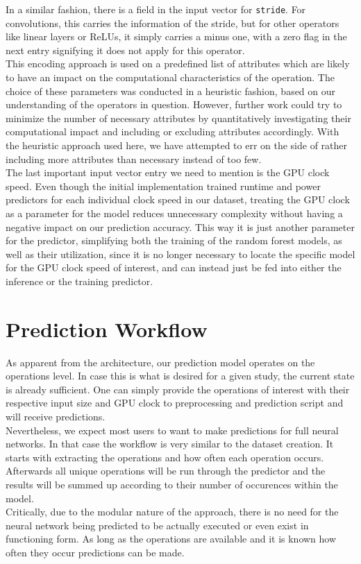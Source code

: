 In a similar fashion, there is a field in the input vector for \texttt{stride}. For convolutions, this carries the information of the stride, but for other operators like  linear layers or ReLUs, it simply carries a minus one, with a zero flag in the next entry signifying it does not apply for this operator. \\
This encoding approach is used on a predefined list of attributes which are likely to have an impact on the computational characteristics of the operation. The choice of these parameters was conducted in a heuristic fashion, based on our understanding of the operators in question. However, further work could try to minimize the number of necessary attributes by quantitatively investigating their computational impact and including or excluding attributes accordingly. With the heuristic approach used here, we have attempted to err on the side of rather including more attributes than necessary instead of too few. \\
The last important input vector entry we need to mention is the GPU clock speed. Even though the initial implementation trained runtime and power predictors for each individual clock speed in our dataset, treating the GPU clock as a parameter for the model reduces unnecessary complexity without having a negative impact on our prediction accuracy. This way it is just another parameter for the predictor, simplifying both the training of the random forest models, as well as their utilization, since it is no longer necessary to locate the specific model for the GPU clock speed of interest, and can instead just be fed into either the inference or the training predictor.



\section{Prediction Workflow}
As apparent from the architecture, our prediction model operates on the operations level. In case this is what is desired for a given study, the current state is already sufficient. One can simply provide the operations of interest with their respective input size and GPU clock to preprocessing and prediction script and will receive predictions. \\
Nevertheless, we expect most users to want to make predictions for full neural networks. In that case the workflow is very similar to the dataset creation. It starts with extracting the operations and how often each operation occurs. Afterwards all unique operations will be run through the predictor and the results will be summed up according to their number of occurences within the model.\\
Critically, due to the modular nature of the approach, there is no need for the neural network being predicted to be actually executed or even exist in functioning form. As long as the operations are available and it is known how often they occur predictions can be made.